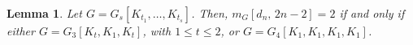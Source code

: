 \documentclass[preprint,12pt]{elsarticle}
\newtheorem{lemma}[theorem]{Lemma}
\begin{document}








\begin{lemma}\label{lema: g3 e g4}
Let $G = G_s[K_{t_1}, \ldots, K_{t_s}]$. Then, $m_G[d_n,\,2n-2] = 2$ if and only if either $G = G_3[K_t, K_1, K_t]$, with {$1 \leq t \leq 2$}, or $G = G_4[K_1, K_1, K_1, K_1]$.
\end{lemma}
\end{document}
